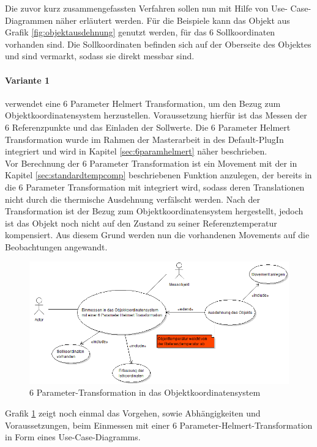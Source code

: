 Die zuvor kurz zusammengefassten Verfahren sollen nun mit Hilfe von Use- Case-  Diagrammen näher erläutert werden. Für die Beispiele kann das Objekt aus Grafik \ref{fig:objektausdehnung} genutzt werden, für das 6 Sollkoordinaten vorhanden sind. Die Sollkoordinaten befinden sich auf der Oberseite des Objektes und sind vermarkt, sodass sie direkt messbar sind.\\

\paragraph{Variante 1} verwendet eine 6 Parameter Helmert Transformation, um den Bezug zum Objektkoordinatensystem herzustellen. Voraussetzung hierfür ist das Messen der 6 Referenzpunkte und das Einladen der Sollwerte. Die 6 Parameter Helmert Transformation wurde im Rahmen der Masterarbeit in des Default-PlugIn integriert und wird in Kapitel \ref{sec:6paramhelmert} näher beschrieben.\\
Vor Berechnung der 6 Parameter Transformation ist ein Movement mit der in Kapitel \ref{sec:standardtempcomp} beschriebenen Funktion anzulegen, der bereits in die 6 Parameter Transformation mit integriert wird, sodass deren Translationen nicht durch die thermische Ausdehnung verfälscht werden.
Nach der Transformation ist der Bezug zum Objektkoordinatensystem hergestellt, jedoch ist das Objekt noch nicht auf den Zustand zu seiner Referenztemperatur kompensiert. Aus diesem Grund werden nun die vorhandenen Movements auf die Beobachtungen angewandt.

\begin{figure}[H]
	\label{fig:einmessen6param}
	\centering
		\includegraphics[scale=0.5]{UMLDiagramme/einmessen6paramUML}
	\caption{6 Parameter-Transformation in das Objektkoordinatensystem}
\end{figure}

Grafik \ref{fig:einmessen6param} zeigt noch einmal das Vorgehen, sowie Abhängigkeiten und Voraussetzungen, beim Einmessen mit einer 6 Parameter-Helmert-Transformation in Form eines Use-Case-Diagramms.

